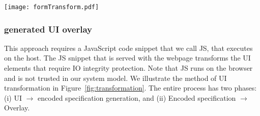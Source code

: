 \begin{figure*}[t]
\centering
\texttt{[image: formTransform.pdf]}
\caption{\textbf{Transformation of UI elements: UI $\rightarrow$ encoded specification $\rightarrow$ \device generated UI overlay.} \one The actual webpage and the corresponding \html source shows the UI elements that requires integrity protection. \two These UI elements are transformed into an encoded UI specification (our \name prototype uses QR code that encodes a UI specification, e.g., Specification~\ref{snippet:UISpecification}) by the \name JS. The QR code. \three AThe QR code decoded and overlaid on the HDMI stream by the \device. \four Upon the user's action on the overlaid UI elements, the device signs all the input data. \five The \device sends these signed input data them to the remote server. Note, that the intermediate QR code transformation (\two) is not visible by the user as it is decoded instantaneously by the device.}
\spacesave
\label{fig:transformation}
\end{figure*}


\subsubsection{\bfseries \device generated UI overlay} \label{sec:systemDesign:transformation:overlay}
 
This approach requires a JavaScript code snippet that we call \name JS, that executes on the host. The \name JS snippet that is served with the webpage transforms the UI elements that require IO integrity protection. Note that \name JS runs on the browser and is not trusted in our system model. We illustrate the method of UI transformation in Figure~\ref{fig:transformation}. The entire process has two phases: (i) UI $\rightarrow$ encoded specification generation, and (ii) Encoded specification $\rightarrow$ Overlay.




